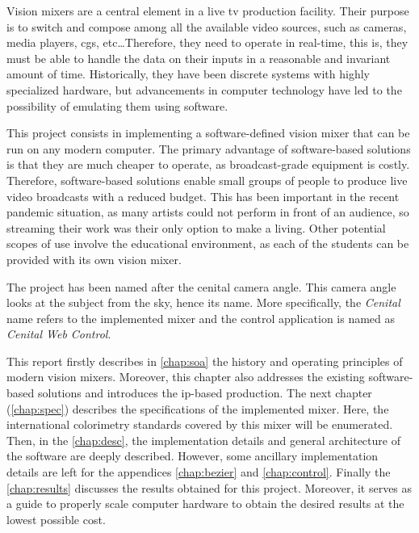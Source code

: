 \documentclass[../main.tex]{subfiles}
\begin{document}
\label{chap:intro}

Vision mixers are a central element in a live \gls{tv} production facility. Their purpose is to switch and compose among all the available video sources, such as cameras, media players, \glspl{cg}, etc\dots Therefore, they need to operate in real-time, this is, they must be able to handle the data on their inputs in a reasonable and invariant amount of time. Historically, they have been discrete systems with highly specialized hardware, but advancements in computer technology have led to the possibility of emulating them using software.\newline

This project consists in implementing a software-defined vision mixer that can be run on any modern computer. The primary advantage of software-based solutions is that they are much cheaper to operate, as broadcast-grade equipment is costly. Therefore, software-based solutions enable small groups of people to produce live video broadcasts with a reduced budget. This has been important in the recent pandemic situation, as many artists could not perform in front of an audience, so streaming their work was their only option to make a living. Other potential scopes of use involve the educational environment, as each of the students can be provided with its own vision mixer. \newline

The project has been named after the cenital camera angle. This camera angle looks at the subject from the sky, hence its name. More specifically, the \textit{Cenital} name refers to the implemented mixer and the control application is named as \textit{Cenital Web Control}.\newline

This report firstly describes in \autoref{chap:soa} the history and operating principles of modern vision mixers. Moreover, this chapter also addresses the existing software-based solutions and introduces the \gls{ip}-based production. The next chapter (\autoref{chap:spec}) describes the specifications of the implemented mixer. Here, the international colorimetry standards covered by this mixer will be enumerated. Then, in the \autoref{chap:desc}, the implementation details and general architecture of the software are deeply described. However, some ancillary implementation details are left for the appendices \ref{chap:bezier} and \ref{chap:control}. Finally the \autoref{chap:results} discusses the results obtained for this project. Moreover, it serves as a guide to properly scale computer hardware to obtain the desired results at the lowest possible cost.\newline



\end{document}
